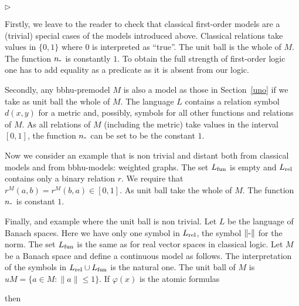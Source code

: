 \documentclass[12pt,letterpaper,oneside,reqno]{amsart}
\newcommand{\mylabel}[1]{{#1}\hfill}
\renewenvironment{itemize}
  {\begin{list}{$\triangleright$}{%
   \setlength{\parskip}{0mm}
   \setlength{\topsep}{.2\baselineskip}
   \setlength{\rightmargin}{0mm}
   \setlength{\listparindent}{0mm}
   \setlength{\itemindent}{0mm}
   \setlength{\labelwidth}{3ex}
   \setlength{\itemsep}{.2\baselineskip}
   \setlength{\parsep}{.2\baselineskip}
   \setlength{\partopsep}{0mm}
   \setlength{\labelsep}{1ex}
   \setlength{\leftmargin}{\labelwidth+\labelsep}
   \let\makelabel\mylabel}}{%
   \end{list}}
\theoremstyle{plain}
\theoremstyle{remark}
\begin{document}
\begin{itemize}
  \item [1.] Firstly, we leave to the reader to check that classical first-order models are a (trivial) special cases of the models introduced above.
  Classical relations take values in $\{0,1\}$ where $0$ is interpreted as ``true''.
  The unit ball is the whole of $M$. 
  The function $n_{\mbox-}$ is constantly $1$.
  To obtain the full strength of first-order logic one has to add equality as a predicate as it is absent from our logic.

  \item [2.] Secondly, any {\sc bbhu}-premodel $M$ is also a model as those in Section~\ref{uno} if we take as unit ball the whole of $M$.
  The language $L$ contains a relation symbol $d(x,y)$ for a metric and, possibly, symbols for all other functions and relations of $M$.
  As all relations of $M$ (including the metric) take values in the interval $[0,1]$, the function $n_{\mbox-}$ can be set to be the constant $1$.

  \item [3.] Now we consider an example that is non trivial and distant both from classical models and from {\sc bbhu}-models: weighted graphs.
  The set $L_{\rm fun}$ is empty and $L_{\rm rel}$ contains only a binary relation $r$.
  We require that $r^M(a,b)=r^M(b,a)\in[0,1]$.
  As unit ball take the whole of $M$.
  The function $n_{\mbox-}$ is constant $1$.
  

  \item [4.] Finally, and example where the unit ball is non trivial.
  Let $L$ be the language of Banach spaces. 
  Here we have only one symbol in $L_{\rm rel}$, the symbol $\|\mbox-\|$ for the norm.
  The set $L_{\rm fun}$ is the same as for real vector spaces in classical logic.
  Let $M$ be a Banach space and define a continuous model as follows.
  The interpretation of the symbols in $L_{\rm rel}\cup L_{\rm fun}$ is the natural one.
  The unit ball of $M$ is $uM=\{a\in M: \|a\|\le1\}$.
  If $\varphi(x)$ is the atomic formulas

  
  then 

  

\end{itemize}
\end{document}
